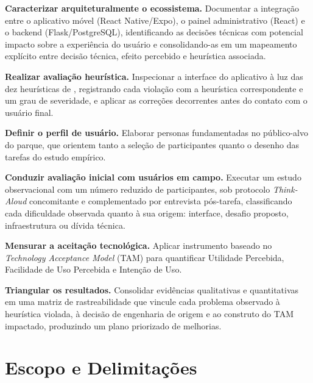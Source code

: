 \begin{alineas}
  \item \textbf{Caracterizar arquiteturalmente o ecossistema.} Documentar a
  integração entre o aplicativo móvel (React Native/Expo), o painel administrativo
  (React) e o backend (Flask/PostgreSQL), identificando as decisões técnicas com
  potencial impacto sobre a experiência do usuário e consolidando-as em um
  mapeamento explícito entre decisão técnica, efeito percebido e heurística
  associada.

  \item \textbf{Realizar avaliação heurística.} Inspecionar a interface do
  aplicativo à luz das dez heurísticas de ,
  registrando cada violação com a heurística correspondente e um grau de
  severidade, e aplicar as correções decorrentes antes do contato com o usuário
  final.

  \item \textbf{Definir o perfil de usuário.} Elaborar personas fundamentadas no
  público-alvo do parque, que orientem tanto a seleção de participantes quanto o
  desenho das tarefas do estudo empírico.

  \item \textbf{Conduzir avaliação inicial com usuários em campo.} Executar um
  estudo observacional com um número reduzido de participantes, sob protocolo
  \textit{Think-Aloud} concomitante e complementado por entrevista pós-tarefa,
  classificando cada dificuldade observada quanto à sua origem: interface,
  desafio proposto, infraestrutura ou dívida técnica.

  \item \textbf{Mensurar a aceitação tecnológica.} Aplicar instrumento baseado no
  \textit{Technology Acceptance Model} (TAM) para quantificar Utilidade Percebida,
  Facilidade de Uso Percebida e Intenção de Uso.

  \item \textbf{Triangular os resultados.} Consolidar evidências qualitativas e
  quantitativas em uma matriz de rastreabilidade que vincule cada problema
  observado à heurística violada, à decisão de engenharia de origem e ao construto
  do TAM impactado, produzindo um plano priorizado de melhorias.
\end{alineas}

\section{Escopo e Delimitações}
\label{sec:escopo}

